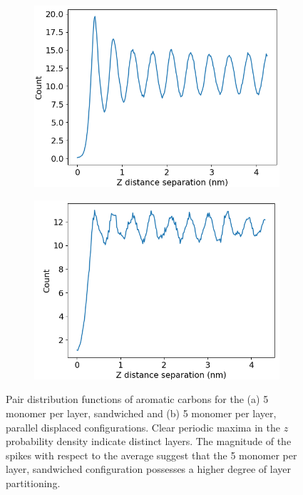 \documentclass{article}
\begin{document}
  \begin{figure}[!ht]
	\centering
	\begin{subfigure}{0.45\textwidth}
		\centering
		\includegraphics[width=\textwidth]{zdf5layered.png}
		\caption{}\label{fig:zdf_layered}
	\end{subfigure}
	\begin{subfigure}{0.45\textwidth}
		\centering
		\includegraphics[width=\textwidth]{zdf5offset.png}
		\caption{}\label{fig:zdf_offset}
	\end{subfigure}
	\caption{Pair distribution functions of aromatic carbons for the
	(a) 5 monomer per layer, sandwiched and (b) 5 monomer per layer, 
	parallel displaced configurations. 
        Clear periodic maxima in the $z$ probability density indicate
	distinct layers. The magnitude of the spikes with respect to the 
	average suggest that the 5 monomer per layer, sandwiched configuration
	possesses a higher degree of layer partitioning.}\label{fig:zdf}
  \end{figure}
\end{document}
